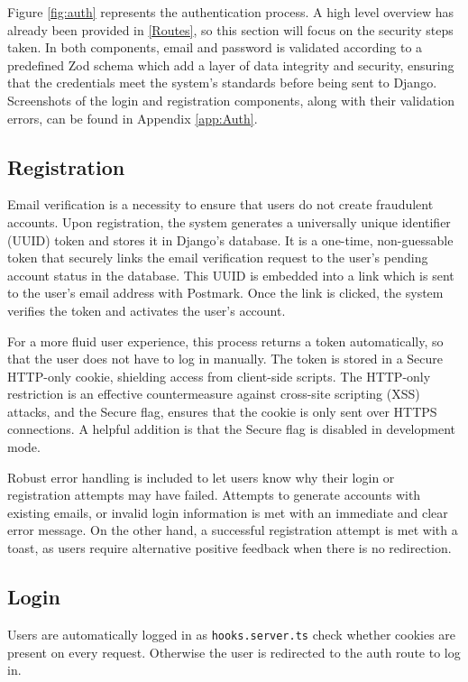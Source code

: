 Figure \ref{fig:auth} represents the authentication process. A high level overview has already been provided in \ref{Routes}, so this section will focus on the security steps taken. In both components, email and password is validated according to a predefined Zod schema which add a layer of data integrity and security, ensuring that the credentials meet the system's standards before being sent to Django. Screenshots of the login and registration components, along with their validation errors, can be found in Appendix \ref{app:Auth}.
\subsection{Registration}
Email verification is a necessity to ensure that users do not create fraudulent accounts. Upon registration, the system generates a universally unique identifier (UUID) token and stores it in Django's database.  It is a one-time, non-guessable token that securely links the email verification request to the user's pending account status in the database. This UUID is embedded into a link which is sent to the user's email address with Postmark. Once the link is clicked, the system verifies the token and activates the user's account.

For a more fluid user experience, this process returns a token automatically, so that the user does not have to log in manually. The token is stored in a Secure HTTP-only cookie, shielding access from client-side scripts. The HTTP-only restriction is an effective countermeasure against cross-site scripting (XSS) attacks, and the Secure flag, ensures that the cookie is only sent over HTTPS connections. A helpful addition is that the Secure flag is disabled in development mode.

Robust error handling is included to let users know why their login or registration attempts may have failed. Attempts to generate accounts with existing emails, or invalid login information is met with an immediate and clear error message. On the other hand, a successful registration attempt is met with a toast, as users require alternative positive feedback when there is no redirection.
\subsection{Login}

Users are automatically logged in as \texttt{hooks.server.ts} check whether cookies are present on every request. Otherwise the user is redirected to the auth route to log in.

